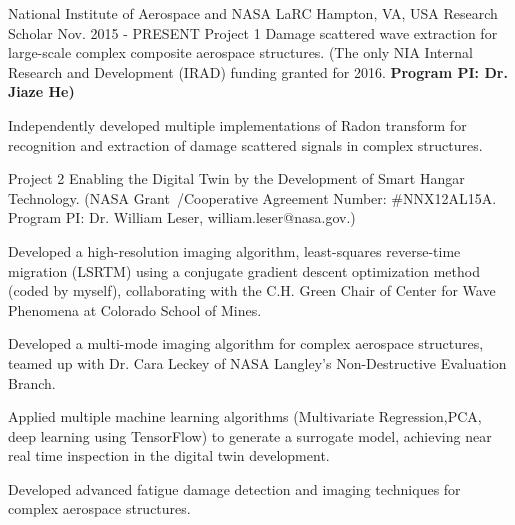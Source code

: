 

\begin{cventries}

  \cventryprojtrueb
    {National Institute of Aerospace and NASA LaRC} %
    {Hampton, VA, USA} %
    {Research Scholar} %
    {Nov. 2015 - PRESENT} %
    {Project 1} %
    {{Damage scattered wave extraction for large-scale complex composite aerospace structures.} (The only NIA Internal Research and Development (IRAD) funding granted for 2016. \bfseries{Program PI: Dr. Jiaze He})}
    {     
     \begin{cvitems} %
       \item {Independently developed multiple implementations of Radon transform for recognition and extraction of damage scattered signals in complex structures.}
      \end{cvitems}
         }
  \cventryprojtruec
   {Project 2} %
   {{Enabling the Digital Twin by the Development of Smart Hangar Technology.} (NASA Grant\ /Cooperative Agreement Number: \#NNX12AL15A. Program PI: Dr. William Leser, william.leser@nasa.gov.)}
    {     
     \begin{cvitems} %
       \item {Developed a high-resolution imaging algorithm, least-squares reverse-time migration (LSRTM) using a conjugate gradient descent optimization method (coded by myself), collaborating with the C.H. Green Chair of Center for Wave Phenomena at Colorado School of Mines. }
       \item {Developed a multi-mode imaging algorithm for complex aerospace structures, teamed up with Dr. Cara Leckey of NASA Langley's Non-Destructive Evaluation Branch.}
       \item {Applied multiple machine learning algorithms (Multivariate Regression,PCA, deep learning using TensorFlow) to generate a surrogate model, achieving near real time inspection in the digital twin development.}
       \item {Developed advanced fatigue damage detection and imaging techniques for complex aerospace structures.}
      \end{cvitems}
         }


\end{cventries}
